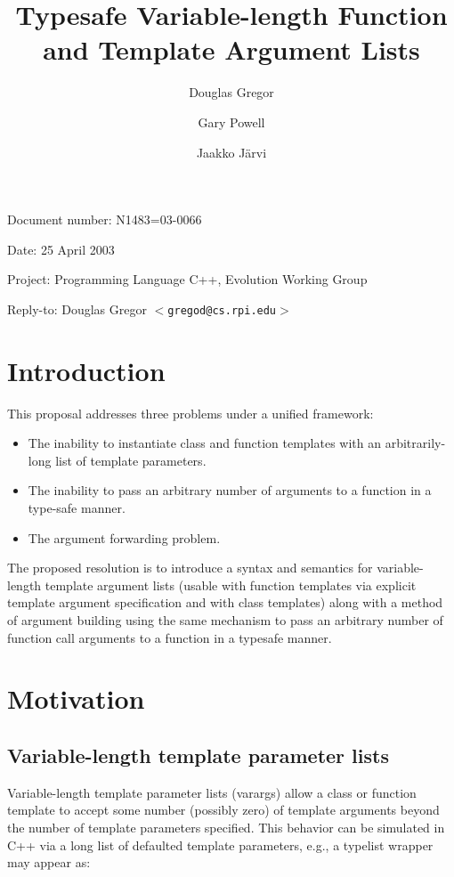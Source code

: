 \documentclass{article}
\begin{document}
\pagestyle{myheadings}

\title{Typesafe Variable-length Function and Template Argument Lists}
\author{Douglas Gregor \and Gary Powell \and Jaakko J\"arvi}
\date{}
\maketitle

\par\noindent Document number: N1483=03-0066
\par\noindent Date: 25 April 2003
\par\noindent Project: Programming Language C++, Evolution Working Group
\par\noindent Reply-to: Douglas Gregor $<${\tt gregod@cs.rpi.edu}$>$

\section{Introduction}
This proposal addresses three problems under a unified framework:
\begin{itemize}
\item The inability to instantiate class and function templates with an arbitrarily-long list of template parameters.
\item The inability to pass an arbitrary number of arguments to a function in a type-safe manner.
\item The argument forwarding problem.
\end{itemize}

The proposed resolution is to introduce a syntax and semantics for
variable-length template argument lists (usable with function templates
via explicit template argument specification and with class templates)
along with a method of argument building using the same mechanism to
pass an arbitrary number of function call arguments to a function in a
typesafe manner.

\section{Motivation}
\subsection{Variable-length template parameter lists}
Variable-length template parameter lists (varargs) allow a class or
function template to accept some number (possibly zero) of template
arguments beyond the number of template parameters specified. This
behavior can be simulated in C++ via a long list of defaulted template
parameters, e.g., a typelist wrapper may appear as:
\end{document}
